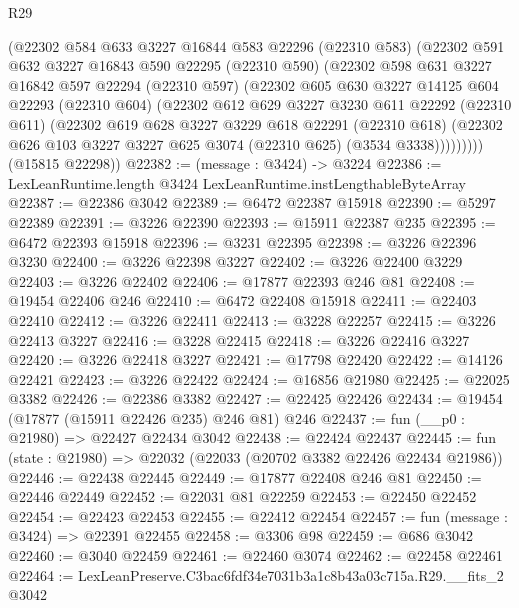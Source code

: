 \begin{lexlean}{R29}
\begin{coremodule}
        (@22302
          @584
          @633
          @3227
          @16844
          @583
          @22296
          (@22310 @583)
          (@22302
            @591
            @632
            @3227
            @16843
            @590
            @22295
            (@22310 @590)
            (@22302
              @598
              @631
              @3227
              @16842
              @597
              @22294
              (@22310 @597)
              (@22302
                @605
                @630
                @3227
                @14125
                @604
                @22293
                (@22310 @604)
                (@22302
                  @612
                  @629
                  @3227
                  @3230
                  @611
                  @22292
                  (@22310 @611)
                  (@22302
                    @619
                    @628
                    @3227
                    @3229
                    @618
                    @22291
                    (@22310 @618)
                    (@22302 @626 @103 @3227 @3227 @625 @3074 (@22310 @625) (@3534 @3338)))))))))
      (@15815 @22298))
@22382 := (message : @3424) -> @3224
@22386 := LexLeanRuntime.length @3424 LexLeanRuntime.instLengthableByteArray
@22387 := @22386 @3042
@22389 := @6472 @22387 @15918
@22390 := @5297 @22389
@22391 := @3226 @22390
@22393 := @15911 @22387 @235
@22395 := @6472 @22393 @15918
@22396 := @3231 @22395
@22398 := @3226 @22396 @3230
@22400 := @3226 @22398 @3227
@22402 := @3226 @22400 @3229
@22403 := @3226 @22402
@22406 := @17877 @22393 @246 @81
@22408 := @19454 @22406 @246
@22410 := @6472 @22408 @15918
@22411 := @22403 @22410
@22412 := @3226 @22411
@22413 := @3228 @22257
@22415 := @3226 @22413 @3227
@22416 := @3228 @22415
@22418 := @3226 @22416 @3227
@22420 := @3226 @22418 @3227
@22421 := @17798 @22420
@22422 := @14126 @22421
@22423 := @3226 @22422
@22424 := @16856 @21980
@22425 := @22025 @3382
@22426 := @22386 @3382
@22427 := @22425 @22426
@22434 := @19454 (@17877 (@15911 @22426 @235) @246 @81) @246
@22437 := fun (__p0 : @21980) => @22427 @22434 @3042
@22438 := @22424 @22437
@22445 := fun (state : @21980) => @22032 (@22033 (@20702 @3382 @22426 @22434 @21986))
@22446 := @22438 @22445
@22449 := @17877 @22408 @246 @81
@22450 := @22446 @22449
@22452 := @22031 @81 @22259
@22453 := @22450 @22452
@22454 := @22423 @22453
@22455 := @22412 @22454
@22457 := fun (message : @3424) => @22391 @22455
@22458 := @3306 @98
@22459 := @686 @3042
@22460 := @3040 @22459
@22461 := @22460 @3074
@22462 := @22458 @22461
@22464 := LexLeanPreserve.C3bac6fdf34e7031b3a1c8b43a03c715a.R29.__fits_2 @3042

\end{coremodule}
\end{lexlean}
